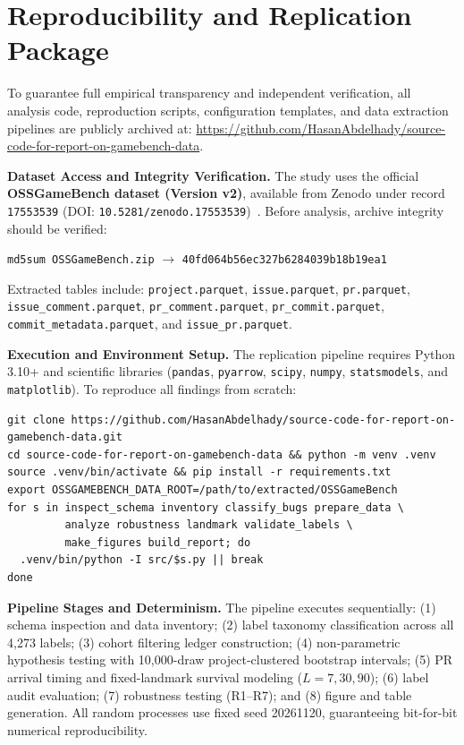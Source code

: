 \section{Reproducibility and Replication Package}\label{sec:repro}

To guarantee full empirical transparency and independent verification, all analysis code, reproduction scripts, configuration templates, and data extraction pipelines are publicly archived at:
\url{https://github.com/HasanAbdelhady/source-code-for-report-on-gamebench-data}.

\textbf{Dataset Access and Integrity Verification.}
The study uses the official \textbf{OSSGameBench dataset (Version v2)}, available from Zenodo under record \texttt{17553539} (DOI: \texttt{10.5281/zenodo.17553539})~\cite{zenodo_ossgamebench_v2}. Before analysis, archive integrity should be verified:
\begin{center}
\texttt{md5sum OSSGameBench.zip} $\rightarrow$ \texttt{40fd064b56ec327b6284039b18b19ea1}
\end{center}
Extracted tables include: \texttt{project.parquet}, \texttt{issue.parquet}, \texttt{pr.parquet}, \texttt{issue\_comment.parquet}, \texttt{pr\_comment.parquet}, \texttt{pr\_commit.parquet}, \texttt{commit\_metadata.parquet}, and \texttt{issue\_pr.parquet}.

\textbf{Execution and Environment Setup.}
The replication pipeline requires Python 3.10+ and scientific libraries (\texttt{pandas}, \texttt{pyarrow}, \texttt{scipy}, \texttt{numpy}, \texttt{statsmodels}, and \texttt{matplotlib}). To reproduce all findings from scratch:
\begin{verbatim}
git clone https://github.com/HasanAbdelhady/source-code-for-report-on-gamebench-data.git
cd source-code-for-report-on-gamebench-data && python -m venv .venv
source .venv/bin/activate && pip install -r requirements.txt
export OSSGAMEBENCH_DATA_ROOT=/path/to/extracted/OSSGameBench
for s in inspect_schema inventory classify_bugs prepare_data \
         analyze robustness landmark validate_labels \
         make_figures build_report; do
  .venv/bin/python -I src/$s.py || break
done
\end{verbatim}

\textbf{Pipeline Stages and Determinism.}
The pipeline executes sequentially: (1) schema inspection and data inventory; (2) label taxonomy classification across all 4{,}273 labels; (3) cohort filtering ledger construction; (4) non-parametric hypothesis testing with 10{,}000-draw project-clustered bootstrap intervals; (5) PR arrival timing and fixed-landmark survival modeling ($L=7, 30, 90$); (6) label audit evaluation; (7) robustness testing (R1--R7); and (8) figure and table generation. All random processes use fixed seed 20261120, guaranteeing bit-for-bit numerical reproducibility.
